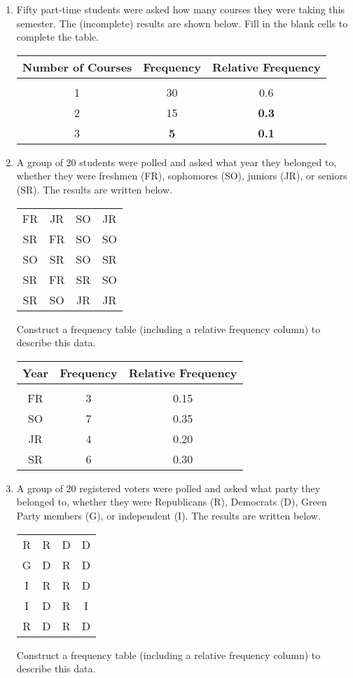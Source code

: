 \begin{enumerate}
\item Fifty part-time students were asked how many courses they were taking this semester. The (incomplete) results are shown below. Fill in the blank cells to complete the table.
\begin{center}
\begin{tabular}{c c c }
\textbf{Number of Courses} & \textbf{Frequency} & \textbf{Relative Frequency}\\
\hline
& & \\
1 & 30 & 0.6\\
2 & 15 & {\LARGE\color{red}\bfseries 0.3}\\
3 & {\LARGE\color{red}\bfseries 5} & {\LARGE\color{red}\bfseries 0.1}
\end{tabular}
\end{center}

\item A group of 20 students were polled and asked what year they belonged to, whether they were freshmen (FR), sophomores (SO), juniors (JR), or seniors (SR).  The results are written below.\begin{center}
\begin{tabular}{c c c c}
FR & JR & SO & JR\\
SR & FR & SO & SO\\
SO & SR & SO & SR\\
SR & FR & SR & SO\\
SR & SO & JR & JR
\end{tabular}
\end{center}
Construct a frequency table (including a relative frequency column) to describe this data.

\begin{center}
\begin{tabular}{c c c}
\textbf{Year} & \textbf{Frequency} & \textbf{Relative Frequency}\\
\hline
& & \\
FR & 3 & 0.15\\
SO & 7 & 0.35\\
JR & 4 & 0.20\\
SR & 6 & 0.30
\end{tabular}
\end{center}

\item A group of 20 registered voters were polled and asked what party they belonged to, whether they were Republicans (R), Democrats (D), Green Party members (G), or independent (I).  The results are written below.\begin{center}
\begin{tabular}{c c c c}
R & R & D & D\\
G & D & R & D\\
I & R & R & D\\
I & D & R & I\\
R & D & R & D
\end{tabular}
\end{center}
Construct a frequency table (including a relative frequency column) to describe this data.


\end{enumerate}
